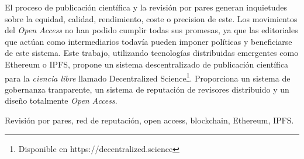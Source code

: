 El proceso de publicación científica y la revisión por pares generan inquietudes
sobre la equidad, calidad, rendimiento, coste o precision de este. Los movimientos del
\emph{Open Access} no han podido cumplir todas sus promesas, ya que las
editoriales que actúan como 
intermediarios todavía pueden imponer políticas y beneficiarse de este sistema.
Este trabajo, utilizando tecnologías distribuidas emergentes como Ethereum o
IPFS, propone un sistema descentralizado de publicación científica para la
\emph{ciencia libre} llamado Decentralized Science\footnote{Disponible en
  https://decentralized.science}. Proporciona un sistema de gobernanza
tranparente, un sistema de reputación de revisores distribuido y un diseño
totalmente \emph{Open Access}.

 Revisión por pares, red de reputación, open access,
blockchain, Ethereum, IPFS.
\endinput
